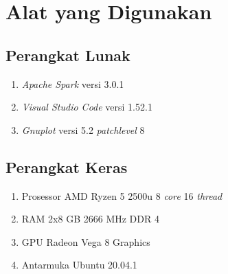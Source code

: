 \documentclass[12pt,a4paper]{report}
\begin{document}
	\section{Alat yang Digunakan}
			\subsection{Perangkat Lunak}
			\begin{enumerate}
				\vspace{-0.2cm} \item \textit{Apache Spark} versi 3.0.1
				\vspace{-0.8cm} \item \textit{Visual Studio Code} versi 1.52.1
				\vspace{-0.8cm} \item \textit{Gnuplot} versi 5.2 \textit{patchlevel} 8
			\end{enumerate}
		
			\subsection{Perangkat Keras}
			\begin{enumerate}
				\vspace{-0.2cm}\item Prosessor AMD Ryzen 5 2500u 8 \textit{core} 16 \textit{thread}
				\vspace{-0.8cm} \item RAM 2x8 GB 2666 MHz DDR 4
				\vspace{-0.8cm} \item GPU Radeon Vega 8 Graphics
				\vspace{-0.8cm} \item Antarmuka Ubuntu 20.04.1
			\end{enumerate}
\end{document}
